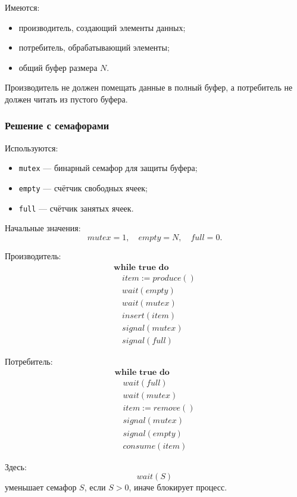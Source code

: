 \documentclass[12pt,a4paper]{article}
\begin{document}
Имеются:
\begin{itemize}
    \item производитель, создающий элементы данных;
    \item потребитель, обрабатывающий элементы;
    \item общий буфер размера $N$.
\end{itemize}

Производитель не должен помещать данные в полный буфер, а потребитель не должен читать из пустого буфера.

\subsubsection{Решение с семафорами}

Используются:
\begin{itemize}
    \item \texttt{mutex} --- бинарный семафор для защиты буфера;
    \item \texttt{empty} --- счётчик свободных ячеек;
    \item \texttt{full} --- счётчик занятых ячеек.
\end{itemize}

Начальные значения:
\[
mutex = 1,\quad empty = N,\quad full = 0.
\]

Производитель:
\[
\begin{array}{l}
\textbf{while true do}\\
\quad item := produce()\\
\quad wait(empty)\\
\quad wait(mutex)\\
\quad insert(item)\\
\quad signal(mutex)\\
\quad signal(full)
\end{array}
\]

Потребитель:
\[
\begin{array}{l}
\textbf{while true do}\\
\quad wait(full)\\
\quad wait(mutex)\\
\quad item := remove()\\
\quad signal(mutex)\\
\quad signal(empty)\\
\quad consume(item)
\end{array}
\]

Здесь:
\[
wait(S)
\]
уменьшает семафор $S$, если $S > 0$, иначе блокирует процесс.
\end{document}
